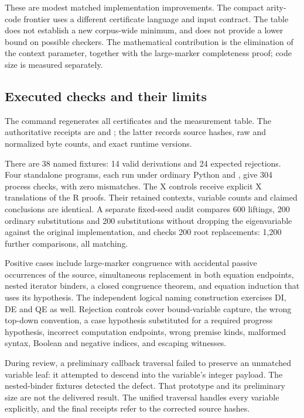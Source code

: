 These are modest matched implementation improvements. The compact
arity-code frontier uses a different certificate language and input
contract. The table does not establish a new corpus-wide minimum, and
does not provide a lower bound on possible checkers. The mathematical
contribution is the elimination of the context parameter, together with
the large-marker completeness proof; code size is measured separately.

\subsection{Executed checks and their limits}

The command  regenerates all
certificates and the measurement table. The authoritative receipts are
 and
; the latter records source hashes,
raw and normalized byte counts, and exact runtime versions.

There are 38 named fixtures: 14 valid derivations and 24 expected
rejections. Four standalone programs, each run under ordinary Python and
, give 304 process checks, with zero mismatches. The X
controls receive explicit X translations of the R proofs. Their retained
contexts, variable counts and claimed conclusions are identical. A
separate fixed-seed audit compares 600 liftings, 200 ordinary
substitutions and 200 substitutions without dropping the eigenvariable
against the original implementation, and checks 200 root replacements:
1,200 further comparisons, all matching.

Positive cases include large-marker congruence with accidental passive
occurrences of the source, simultaneous replacement in both equation
endpoints, nested iterator binders, a closed congruence theorem, and
equation induction that uses its hypothesis. The independent logical
naming construction exercises DI, DE and QE as well. Rejection controls
cover bound-variable capture, the wrong top-down convention, a case
hypothesis substituted for a required progress hypothesis, incorrect
computation endpoints, wrong premise kinds, malformed syntax, Boolean
and negative indices, and escaping witnesses.

During review, a preliminary callback traversal failed to preserve an
unmatched variable leaf: it attempted to descend into the variable's
integer payload. The nested-binder fixtures detected the defect. That
prototype and its preliminary size are not the delivered result. The
unified traversal handles every variable explicitly, and the final
receipts refer to the corrected source hashes.


